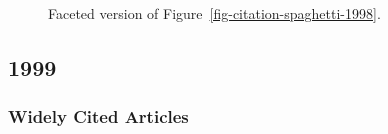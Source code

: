 \documentclass[
  10pt,
  letterpaper,
  DIV=11,
  numbers=noendperiod,
  twoside]{scrartcl}
\begin{document}
\begin{figure}


\caption{\label{fig-citation-facet-1998}Faceted version of
Figure~\ref{fig-citation-spaghetti-1998}.}

\end{figure}%

\newpage

\subsection{1999}\label{sec-s1999}

\subsubsection*{Widely Cited Articles}\label{widely-cited-articles-43}
\end{document}

